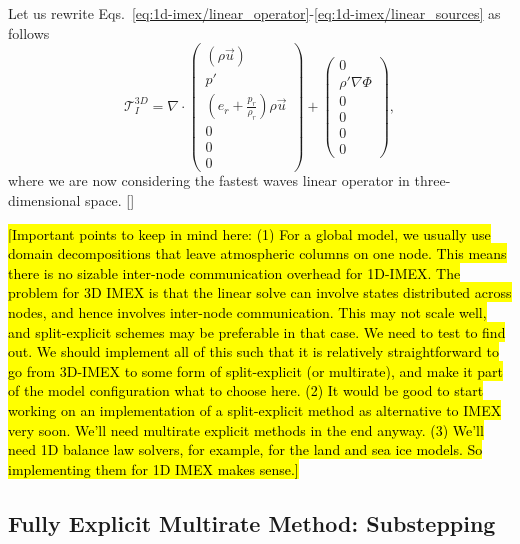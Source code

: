 \documentclass{report}
\begin{document}
{ Let us rewrite Eqs.\ \eqref{eq:1d-imex/linear_operator}-\eqref{eq:1d-imex/linear_sources} as follows
 \begin{equation}
 \mathcal{T}^{3D}_{I} = \nabla \cdot \left( \begin{array}{c}
 \left( \rho \vec{u} \right) \\
 p'  \\
 \left( e_r + \frac{p_r}{\rho_r} \right) \rho \vec{u} \\
 0 \\
0 \\
0
\end{array}
\right)
+
\left( \begin{array}{c}
0 \\
\rho' \nabla \Phi \\
0 \\
0 \\
0 \\
0 
\end{array}
\right),
\label{eq:1d-imex/linear_operator_3d}
\end{equation}
where we are now considering the fastest waves linear operator in three-dimensional space.
[]

\hl{[Important points to keep in mind here: (1) For a global model, we usually use domain decompositions that leave atmospheric columns on one node. This means there is no sizable inter-node communication overhead for 1D-IMEX. The problem for 3D IMEX is that the linear solve can involve states distributed across nodes, and hence involves inter-node communication. This may not scale well, and split-explicit schemes may be preferable in that case. We need to test to find out. We should implement all of this such that it is relatively straightforward to go from 3D-IMEX to some form of split-explicit (or multirate), and make it part of the model configuration what to choose here. (2) It would be good to start working on an implementation of a split-explicit method as alternative to IMEX very soon. We'll need multirate explicit methods in the end anyway. (3) We'll need 1D balance law solvers, for example, for the land and sea ice models. So implementing them for 1D IMEX makes sense.]}

\subsection{Fully Explicit Multirate Method: Substepping}
\label{sec:substepping}

}
\end{document}
